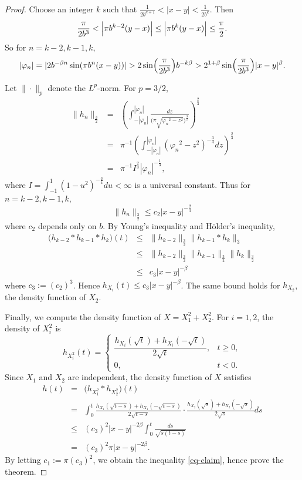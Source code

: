 \documentclass[12pt, reqno]{amsart}
\theoremstyle{plain}
\theoremstyle{definition}
\theoremstyle{remark}
\begin{document}
\begin{proof}
	Choose an integer \( k \) such that $\frac{1}{2b^{k+1}} < |x-y| < \frac{1}{2b^k}$. 	Then
	\begin{equation*}
		\frac{\pi}{2b^3} < \Bigl|\pi b^{k-2}(y-x)\Bigr|\le \Bigl|\pi b^k(y-x)\Bigr| \le \frac{\pi}{2}.
	\end{equation*}
	So for \( n = k-2,k-1,k \),
	\begin{equation*}
		|\varphi_n|=|2b^{-\beta n}\sin(\pi b^n(x-y))| > 2\sin\Bigl(\frac{\pi}{2b^3}\Bigr) b^{-k\beta}
		> 2^{1+\beta}\sin\Bigl(\frac{\pi}{2b^3}\Bigr) |x-y|^\beta.
	\end{equation*}
	
	Let \( \|\cdot\|_p \) denote the \( L^p \)-norm. For \( p=3/2 \),
	\begin{eqnarray*}
		\|h_n\|_{\frac32}
			&=& \left( \int_{-|\varphi_n|}^{|\varphi_n|} \frac{dz}{\bigl(\pi\sqrt{{\varphi_n}^2-z^2}\bigr)^{\frac32}} \right)^{\frac23} \\
			&=& \pi^{-1} \left( \int_{-|\varphi_n|}^{|\varphi_n|} ({\varphi_n}^2-z^2)^{-\frac34}dz \right)^{\frac23} \\
			&=& \pi^{-1} I^{\frac23} |\varphi_n|^{-\frac13},
	\end{eqnarray*}
	where \( I = \int_{-1}^1 (1-u^2)^{-\frac34}du < \infty \) is a universal constant. Thus for \( n=k-2,k-1,k \),
	\[
	\|h_n\|_{\frac32} \le c_2 |x-y|^{-\frac{\beta}{3}}
	\]
	where \( c_2 \) depends only on \( b \). 	By Young's inequality and H\"older's inequality,
	\begin{eqnarray*}
		\bigl(h_{k-2} * h_{k-1} * h_k\bigr)(t)
			&\le& \|h_{k-2}\|_{\frac32} \|h_{k-1} * h_k\|_3 \\
			&\le&  \|h_{k-2}\|_{\frac32} \|h_{k-1}\|_{\frac32}\|h_k\|_{\frac32} \\
			& \le& c_3 |x-y|^{-\beta}
	\end{eqnarray*} 
	where $c_3 :=(c_2)^3$. Hence $h_{X_i}(t) \le c_3 |x-y|^{-\beta}$. The same bound holds for  $h_{X_2}$, the density function of $X_2$.
	
	Finally, we compute the density function of $X= X_1^2 + X_2^2$. For \( i=1,2 \), the density of \( X_i^2 \) is
	\begin{equation*}
		h_{X_i^2}(t) =
		\begin{cases}
			\dfrac{h_{X_i}(\sqrt{t})+h_{X_i}(-\sqrt{t})}{2\sqrt{t}}, & t\ge 0, \\
			0, & t<0.
		\end{cases}
	\end{equation*}
	Since \( X_1 \) and \( X_2 \) are independent, the density function of \( X \) satisfies
	\begin{eqnarray*}
			h(t) &=& \bigl(h_{X_1^2} * h_{X_2^2}\bigr)(t) \\
			&=& \int_0^t \frac{h_{X_1}(\sqrt{t-s})+h_{X_1}(-\sqrt{t-s})}{2\sqrt{t-s}}
			\cdot \frac{h_{X_2}(\sqrt{s})+h_{X_2}(-\sqrt{s})}{2\sqrt{s}} ds \\
			&\le& ({c_3})^2|x-y|^{-2\beta} \int_0^t \frac{ds}{\sqrt{s(t-s)}} \\
			&=& ({c_3})^2\pi |x-y|^{-2\beta}.
	\end{eqnarray*}
By letting $c_1 :=\pi ({c_3})^2$, we obtain the inequality \eqref{eq-claim}, hence prove the theorem.
\end{proof}
\end{document}
